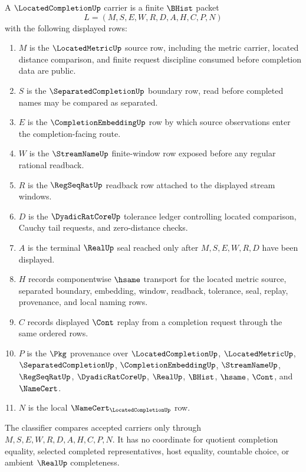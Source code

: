\begin{definition}
\label{def:located-completion-carrier}
A $\LocatedCompletionUp$ carrier is a finite $\BHist$ packet
$$
L=(M,S,E,W,R,D,A,H,C,P,N)
$$
with the following displayed rows:
\begin{enumerate}
\item $M$ is the $\LocatedMetricUp$ source row, including the metric carrier, located distance comparison, and finite request discipline consumed before completion data are public.
\item $S$ is the $\SeparatedCompletionUp$ boundary row, read before completed names may be compared as separated.
\item $E$ is the $\CompletionEmbeddingUp$ row by which source observations enter the completion-facing route.
\item $W$ is the $\StreamNameUp$ finite-window row exposed before any regular rational readback.
\item $R$ is the $\RegSeqRatUp$ readback row attached to the displayed stream windows.
\item $D$ is the $\DyadicRatCoreUp$ tolerance ledger controlling located comparison, Cauchy tail requests, and zero-distance checks.
\item $A$ is the terminal $\RealUp$ seal reached only after $M,S,E,W,R,D$ have been displayed.
\item $H$ records componentwise $\hsame$ transport for the located metric source, separated boundary, embedding, window, readback, tolerance, seal, replay, provenance, and local naming rows.
\item $C$ records displayed $\Cont$ replay from a completion request through the same ordered rows.
\item $P$ is the $\Pkg$ provenance over $\LocatedCompletionUp$, $\LocatedMetricUp$, $\SeparatedCompletionUp$, $\CompletionEmbeddingUp$, $\StreamNameUp$, $\RegSeqRatUp$, $\DyadicRatCoreUp$, $\RealUp$, $\BHist$, $\hsame$, $\Cont$, and $\NameCert$.
\item $N$ is the local $\NameCert_{\LocatedCompletionUp}$ row.
\end{enumerate}
The classifier compares accepted carriers only through $M,S,E,W,R,D,A,H,C,P,N$. It has no coordinate for quotient completion equality, selected completed representatives, host equality, countable choice, or ambient $\RealUp$ completeness.
\end{definition}

